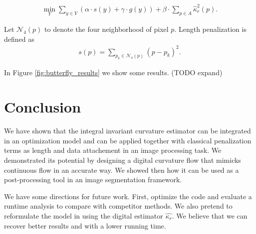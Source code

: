 \documentclass[runningheads]{llncs}
\begin{document}
\begin{align}			
	\min_{Y} \sum_{y \in Y}{\left( \alpha \cdot s(y) + \gamma \cdot g(y) \right)} + \beta \cdot \sum_{p \in A}{\hat{\kappa}_{r}^2(p)}.
	\label{eq:boundary-correction-energy}
\end{align}
	
	Let $\mathcal{N}_4(p)$ to denote the four neighborhood of pixel $p$. Length penalization is defined as
	\begin{align*}
		s(p)=\sum_{p_k \in \mathcal{N}_4(p)}{ (p-p_k) }^2.
	\end{align*}


In Figure \ref{fig:butterfly_results} we show some results. (TODO expand)

\section{Conclusion}
We have shown that the integral invariant curvature estimator can be integrated in an optimization model and can be applied together with classical penalization terms as length and data attachement in an image processing task. We demonstrated its potential by designing a digital curvature flow that mimicks continuous flow in an accurate way. We showed then how it can be used as a post-processing tool in an image segmentation framework. 

We have some directions for future work. First, optimize the code and evaluate a runtime analysis to compare with competitor methods. We also pretend to reformulate the model in \cite{schoenemann09} using the digital estimator $\hat{\kappa_r}$. We believe that we can recover better results and with a lower running time.
	
\end{document}
